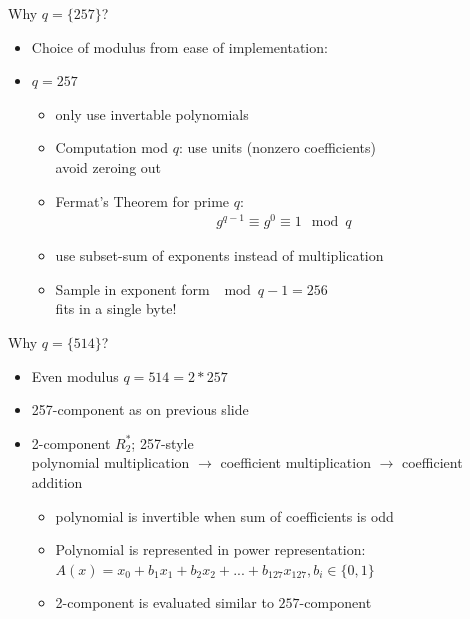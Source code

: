 \documentclass[10pt]{beamer}
\begin{document}
\begin{frame}{Why $q=\{257\}$?}
  \begin{itemize}
    \item Choice of modulus from ease of implementation: 
    \item $q=257$
      \begin{itemize}
        \item only use \alert{invertable} polynomials \pause \\ 
        \item Computation mod $q$: use units (nonzero coefficients) \pause \\
          avoid zeroing out 
        \item Fermat's Theorem for prime $q$: 
          \begin{align*}
            g^{q-1}\equiv g^0 \equiv 1 \mod q 
          \end{align*}\pause
        \item use subset-sum of exponents instead of multiplication \pause
        \item Sample in exponent form $\mod q-1= 256$\pause \\ 
          fits in a single byte!
      \end{itemize}
  \end{itemize}
\end{frame}

\begin{frame}{Why $q=\{514\}$?}
  \begin{itemize}
    \item Even modulus $q=514=2*257$\pause
    \item 257-component as on previous slide\pause
    \item 2-component $R_2^*$; 257-style\pause\\ 
      polynomial multiplication $\rightarrow$ coefficient multiplication
      $\rightarrow$ coefficient addition
      \begin{itemize}
        \item polynomial is \alert{invertible} when sum of coefficients is
          odd\pause
        \item Polynomial is represented in \alert{power representation}: $A(x)=x_0+b_1x_1+b_2x_2+...+b_{127}x_{127}, b_i\in \{0,1\}$\pause \\
        \item 2-component is evaluated similar to $257$-component 
      \end{itemize}
  \end{itemize}
\end{frame}
\end{document}
